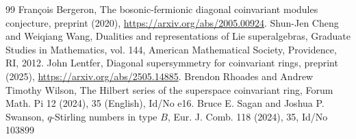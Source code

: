 \documentclass[11pt]{amsart}
\theoremstyle{definition}
\newcommand{\0}{\emptyset}
\begin{document}
\begin{thebibliography}{99}
    Fran\c{c}ois Bergeron, The bosonic-fermionic diagonal coinvariant modules conjecture, preprint (2020), \url{https://arxiv.org/abs/2005.00924}.
 Shun-Jen Cheng and Weiqiang Wang, Dualities and representations of Lie superalgebras, Graduate Studies in
Mathematics, vol. 144, American Mathematical Society, Providence, RI, 2012.
 John Lentfer, Diagonal supersymmetry for coinvariant rings, preprint (2025), \url{https://arxiv.org/abs/2505.14885}.
 Brendon Rhoades and Andrew Timothy Wilson, The Hilbert series of the superspace coinvariant ring, Forum Math.
Pi 12 (2024), 35 (English), Id/No e16.
 Bruce E. Sagan and Joshua P. Swanson, $q$-Stirling numbers in type $B$, Eur. J. Comb. 118 (2024), 35, Id/No 103899
\end{thebibliography}
\end{document}
